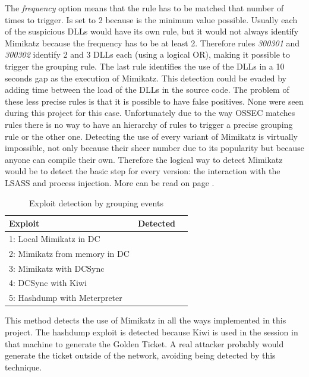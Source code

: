 \linej
The \textit{frequency} option means that the rule has to be matched that number of times to trigger. Is set to 2 because is the minimum value possible.
\linej
\linej
Usually each of the suspicious DLLs would have its own rule, but it would not always identify Mimikatz because the frequency has to be at least 2. Therefore rules \textit{300301} and \textit{300302} identify 2 and 3 DLLs each (using a logical OR), making it possible to trigger the grouping rule.
The last rule identifies the use of the DLLs in a 10 seconds gap as the execution of Mimikatz. This detection could be evaded by adding time between the load of the DLLs in the source code.
\linej
\linej
The problem of these less precise rules is that it is possible to have false positives. None were seen during this project for this case.
\linej
Unfortunately due to the way OSSEC matches rules there is no way to have an hierarchy of rules to trigger a precise grouping rule or the other one.
\linej
\linej
Detecting the use of every variant of Mimikatz is virtually impossible, not only because their sheer number due to its popularity but because anyone can compile their own. Therefore the logical way to detect Mimikatz would be to detect the basic step for every version: the interaction with the LSASS and process injection. More can be read on page \pageref{detect_lsass}.

\begin{table}[H]
	\centering
	\begin{tabular}{|l|l|l|}
		\hline
		\rowcolor{gray!30}
		Exploit & Detected \\ \hline
		1: Local Mimikatz in DC& \RYES\\ \hline
		2: Mimikatz from memory in DC& \RYES\\ \hline
		3: Mimikatz with DCSync& \RYES\\ \hline
		4: DCSync with Kiwi& \RYES\\ \hline
		5: Hashdump with Meterpreter& \RYES\\ \hline
	\end{tabular}
	\caption{Exploit detection by grouping events}
\end{table}
This method detects the use of Mimikatz in all the ways implemented in this project.
The hashdump exploit is detected because Kiwi is used in the session in that machine to generate the Golden Ticket. A real attacker probably would generate the ticket outside of the network, avoiding being detected by this technique.

